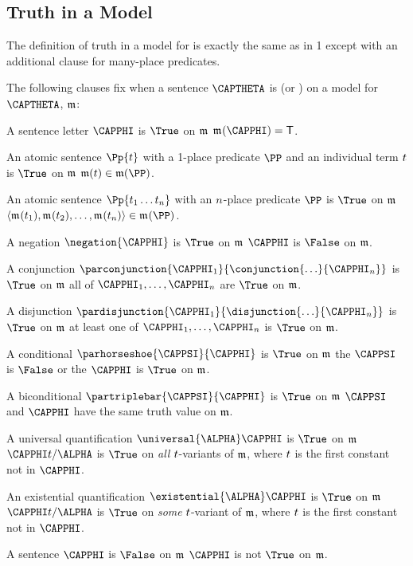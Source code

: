 \subsection{Truth in a Model}\label{GQL Truth in an Interpretation}

The definition of truth in a model for \GQL{} is exactly the same as in \GQL{}1 except with an additional clause for many-place predicates.

\begin{majorILnc}{}
The following clauses fix when a \GQL{} sentence $\CAPTHETA$ is \nidf{$\True$} (or \nidf{$\False$}) on a model for $\CAPTHETA$, $\mathfrak{m}$:
\begin{cenumerate}
	\item A sentence letter $\CAPPHI$ is $\True$ on $\mathfrak{m}$ \Iff $\As{}{}(\CAPPHI)=\TrueB$.
	\item An atomic sentence $\Pp{\variable{t}}$ with a 1-place predicate $\PP$ and an individual term $t$ is $\True$ on $\mathfrak{m}$ \Iff $\IntA(\variable{t})\in\IntA(\PP)$.
	\item\label{formtruthatomicn} An atomic sentence $\Pp{\variable{t}_1\ldots\variable{t}_{\integer{n}}}$ with an $n$-place predicate $\PP$ is $\True$ on $\mathfrak{m}$ \Iff $\langle \As{}{}(\variable{t}_1),\As{}{}(\variable{t}_2),\ldots,\As{}{}(\variable{t}_{\integer{n}}) \rangle \in \As{}{}(\PP)$. 
	\item A negation $\negation{\CAPPHI}$ is $\True$ on $\mathfrak{m}$ \Iff $\CAPPHI$ is $\False$ on $\mathfrak{m}$.
	\item A conjunction $\parconjunction{\CAPPHI_1}{\conjunction{\ldots}{\CAPPHI_{\integer{n}}}}$ is $\True$ on $\mathfrak{m}$ \Iff all of $\CAPPHI_1,\ldots,\CAPPHI_{\integer{n}}$ are $\True$ on $\mathfrak{m}$.
	\item A disjunction $\pardisjunction{\CAPPHI_1}{\disjunction{\ldots}{\CAPPHI_{\integer{n}}}}$ is $\True$ on $\mathfrak{m}$ \Iff at least one of $\CAPPHI_1,\ldots,\CAPPHI_{\integer{n}}$ is $\True$ on $\mathfrak{m}$.
	\item A conditional $\parhorseshoe{\CAPPSI}{\CAPPHI}$ is $\True$ on $\mathfrak{m}$ \Iff the  $\CAPPSI$ is $\False$ or the  $\CAPPHI$ is $\True$ on $\mathfrak{m}$.
	\item A biconditional $\partriplebar{\CAPPSI}{\CAPPHI}$ is $\True$ on $\mathfrak{m}$ \Iff $\CAPPSI$ and $\CAPPHI$ have the same truth value on $\mathfrak{m}$.
	\item\label{GQLTruthUnvQuant} A universal quantification $\universal{\ALPHA}\CAPPHI$ is $\True$ on $\mathfrak{m}$ \Iff $\CAPPHI\variable{t}/\ALPHA$ is $\True$ on \emph{all} $t$-variants of $\mathfrak{m}$, where $t$ is the first constant not in $\CAPPHI$.
	\item An existential quantification $\existential{\ALPHA}\CAPPHI$ is $\True$ on $\mathfrak{m}$ \Iff $\CAPPHI\variable{t}/\ALPHA$ is $\True$ on \emph{some} $t$-variant of $\mathfrak{m}$, where $t$ is the first constant not in $\CAPPHI$.
	\item A sentence $\CAPPHI$ is $\False$ on $\mathfrak{m}$ \Iff $\CAPPHI$ is not $\True$ on $\mathfrak{m}$.
\end{cenumerate}
\end{majorILnc}

